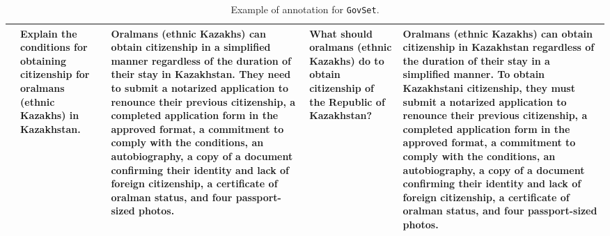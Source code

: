 \begin{table*}[ht!]
\begin{tabular}{@{}p{}p{}p{}p{}p{}@{}}
 & Explain the conditions for obtaining citizenship for oralmans (ethnic Kazakhs) in Kazakhstan. & Oralmans (ethnic Kazakhs) can obtain citizenship in a simplified manner regardless of the duration of their stay in Kazakhstan. They need to submit a notarized application to renounce their previous citizenship, a completed application form in the approved format, a commitment to comply with the conditions, an autobiography, a copy of a document confirming their identity and lack of foreign citizenship, a certificate of oralman status, and four passport-sized photos. & What should oralmans (ethnic Kazakhs) do to obtain citizenship of the Republic of Kazakhstan? & Oralmans (ethnic Kazakhs) can obtain citizenship in Kazakhstan regardless of the duration of their stay in a simplified manner. To obtain Kazakhstani citizenship, they must submit a notarized application to renounce their previous citizenship, a completed application form in the approved format, a commitment to comply with the conditions, an autobiography, a copy of a document confirming their identity and lack of foreign citizenship, a certificate of oralman status, and four passport-sized photos.\\
\hline
\end{tabular}
\caption{Example of annotation for \texttt{GovSet}.}
\label{tab:localizing-kz-ru-ex}
\end{table*}
\clearpage




